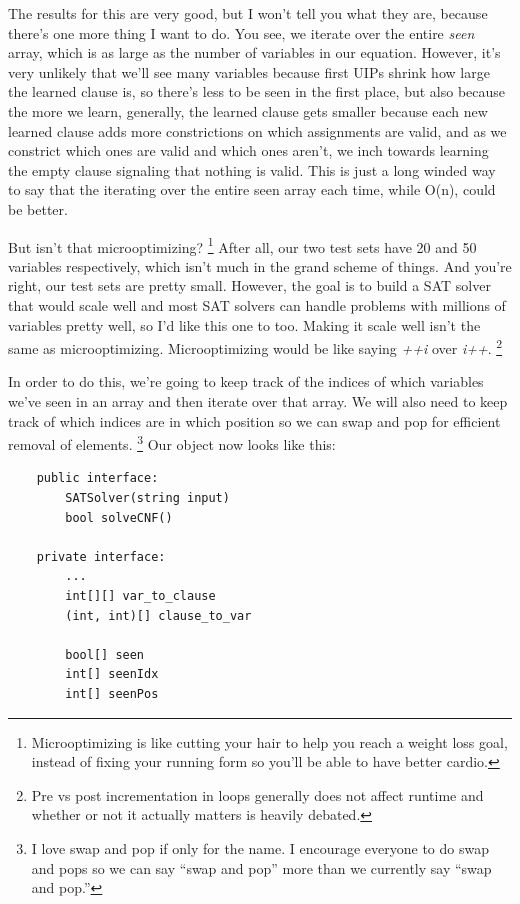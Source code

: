 \documentclass[../main.tex]{subfiles}
\begin{document}
The results for this are very good, but I won't tell you what they are, because there's 
one more thing I want to do. You see, we iterate over the entire \textit{seen} array,
which is as large as the number of variables in our equation. However, it's very unlikely 
that we'll see many variables because first UIPs shrink how large the learned clause is, 
so there's less to be seen in the first place, but also because the more we learn, generally,
the learned clause gets smaller because each new learned clause adds more constrictions on 
which assignments are valid, and as we constrict which ones are valid and which ones aren't,
we inch towards learning the empty clause signaling that nothing is valid. This is just a 
long winded way to say that the iterating over the entire seen array each time, while O(n),
could be better.

But isn't that microoptimizing?
\footnote{Microoptimizing is like cutting your hair to help you reach a weight loss goal, 
instead of fixing your running form so you'll be able to have better cardio.}
After all, our two test sets have 20 and 50 variables 
respectively, which isn't much in the grand scheme of things. And you're right, our test 
sets are pretty small. However, the goal is to build a SAT solver that would scale well 
and most SAT solvers can handle problems with millions of variables pretty well, so I'd 
like this one to too. Making it scale well isn't the same as microoptimizing. Microoptimizing 
would be like saying \textit{++i} over \textit{i++}.
\footnote{Pre vs post incrementation in loops generally does not affect runtime and whether 
or not it actually matters is heavily debated.}

In order to do this, we're going to keep track of the indices of which variables we've
seen in an array and then iterate over that array. We will also need to keep track of 
which indices are in which position so we can swap and pop for efficient removal of 
elements.
\footnote{I love swap and pop if only for the name. I encourage everyone to do swap and 
pops so we can say ``swap and pop'' more than we currently say ``swap and pop.''}
Our object now looks like this:

\begin{lstlisting}
    public interface:
        SATSolver(string input)
        bool solveCNF()

    private interface:
        ...
        int[][] var_to_clause
        (int, int)[] clause_to_var

        bool[] seen
        int[] seenIdx
        int[] seenPos
\end{lstlisting}
\end{document}
